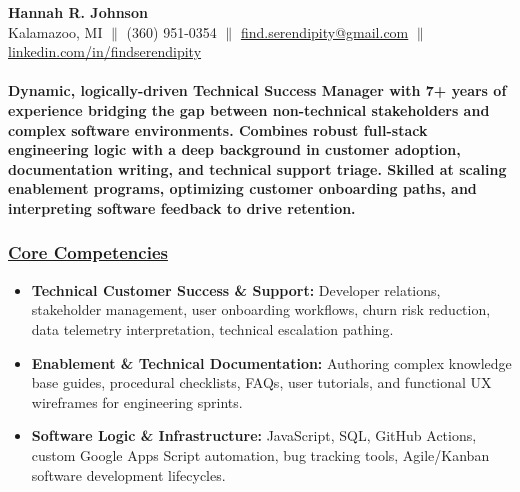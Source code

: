 \documentclass[a4paper,10pt]{article}
\begin{document}
\begin{center}
      {\LARGE \textbf{Hannah R. Johnson}} \\
      Kalamazoo, MI {$\parallel$} (360) 951-0354 {$\parallel$} \href{mailto:find.serendipity@gmail.com}{find.serendipity@gmail.com} {$\parallel$} \href{https://www.linkedin.com/in/findserendipity/}{linkedin.com/in/findserendipity}
\end{center}

\paragraph{Dynamic, logically-driven Technical Success Manager with 7+ years of experience bridging the gap between non-technical stakeholders and complex software environments. Combines robust full-stack engineering logic with a deep background in customer adoption, documentation writing, and technical support triage. Skilled at scaling enablement programs, optimizing customer onboarding paths, and interpreting software feedback to drive retention.}

\subsubsection{\underline{Core Competencies}}

\begin{itemize}
    \item \textbf{Technical Customer Success \& Support:} Developer relations, stakeholder management, user onboarding workflows, churn risk reduction, data telemetry interpretation, technical escalation pathing.
    \item \textbf{Enablement \& Technical Documentation:} Authoring complex knowledge base guides, procedural checklists, FAQs, user tutorials, and functional UX wireframes for engineering sprints.
    \item \textbf{Software Logic \& Infrastructure:} JavaScript, SQL, GitHub Actions, custom Google Apps Script automation, bug tracking tools, Agile/Kanban software development lifecycles.
\end{itemize}
\end{document}
